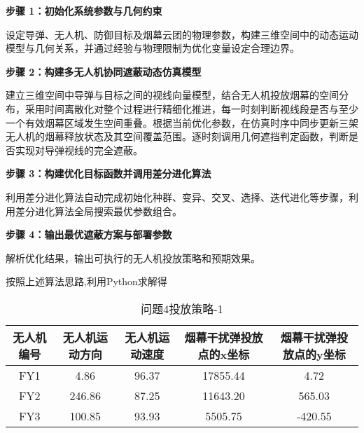 \documentclass[../main.tex]{subfiles}
\begin{document}

\noindent \textbf{步骤 1：初始化系统参数与几何约束}

设定导弹、无人机、防御目标及烟幕云团的物理参数，构建三维空间中的动态运动模型与几何关系，并通过经验与物理限制为优化变量设定合理边界。

\noindent \textbf{步骤 2：构建多无人机协同遮蔽动态仿真模型} 

建立三维空间中导弹与目标之间的视线向量模型，结合无人机投放烟幕的空间分布，采用时间离散化对整个过程进行精细化推进，每一时刻判断视线段是否与至少一个有效烟幕区域发生空间重叠。根据当前优化参数，在仿真时序中同步更新三架无人机的烟幕释放状态及其空间覆盖范围。逐时刻调用几何遮挡判定函数，判断是否实现对导弹视线的完全遮蔽。

\noindent \textbf{步骤 3：构建优化目标函数并调用差分进化算法} 

利用差分进化算法自动完成初始化种群、变异、交叉、选择、迭代进化等步骤，利用差分进化算法全局搜索最优参数组合。


\noindent \textbf{步骤 4：输出最优遮蔽方案与部署参数} 

解析优化结果，输出可执行的无人机投放策略和预期效果。


按照上述算法思路,利用Python求解得

\begin{table}[H]
\caption{问题4投放策略-1}
\label{tab:001} 
\centering
\begin{small}
\begin{tabular}{ccccc}
\toprule[1.5pt]
无人机编号 &无人机运动方向 & 无人机运动速度  & 烟幕干扰弹投放点的x坐标& 烟幕干扰弹投放点的y坐标 \\
\midrule[1pt]
FY1 & 4.86             &  96.37                    & 17855.44                    & 4.72     \\            
FY2 & 246.86           &  87.25                    & 11643.20                    & 565.03      \\           
FY3 & 100.85           &  93.93                    & 5505.75                    & -420.55      \\           
\bottomrule[1.5pt]
\end{tabular}
\end{small}
\end{table}
\end{document}
